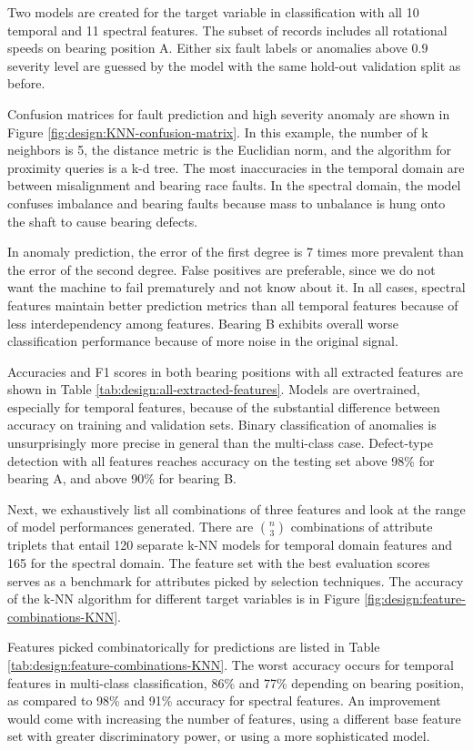 Two models are created for the target variable in classification with all 10 temporal and 11 spectral features. The subset of records includes all rotational speeds on bearing position A. Either six fault labels or anomalies above 0.9 severity level are guessed by the model with the same hold-out validation split as before. 

Confusion matrices for fault prediction and high severity anomaly are shown in Figure \ref{fig:design:KNN-confusion-matrix}. In this example, the number of k neighbors is 5, the distance metric is the Euclidian norm, and the algorithm for proximity queries is a k-d tree. The most inaccuracies in the temporal domain are between misalignment and bearing race faults. In the spectral domain, the model confuses imbalance and bearing faults because mass to unbalance is hung onto the shaft to cause bearing defects. 

In anomaly prediction, the error of the first degree is 7 times more prevalent than the error of the second degree. False positives are preferable, since we do not want the machine to fail prematurely and not know about it. In all cases, spectral features maintain better prediction metrics than all temporal features because of less interdependency among features. Bearing B exhibits overall worse classification performance because of more noise in the original signal.

Accuracies and F1 scores in both bearing positions with all extracted features are shown in Table \ref{tab:design:all-extracted-features}. Models are overtrained, especially for temporal features, because of the substantial difference between accuracy on training and validation sets. Binary classification of anomalies is unsurprisingly more precise in general than the multi-class case. Defect-type detection with all features reaches accuracy on the testing set above 98\% for bearing A, and above 90\% for bearing B.

Next, we exhaustively list all combinations of three features and look at the range of model performances generated. There are $\binom{n}{3}$ combinations of attribute triplets that entail 120 separate k-NN models for temporal domain features and 165 for the spectral domain. The feature set with the best evaluation scores serves as a benchmark for attributes picked by selection techniques. The accuracy of the k-NN algorithm for different target variables is in Figure \ref{fig:design:feature-combinations-KNN}. 



Features picked combinatorically for predictions are listed in Table \ref{tab:design:feature-combinations-KNN}. The worst accuracy occurs for temporal features in multi-class classification, 86\% and 77\% depending on bearing position, as compared to 98\% and 91\% accuracy for spectral features. An improvement would come with increasing the number of features, using a different base feature set with greater discriminatory power, or using a more sophisticated model.

